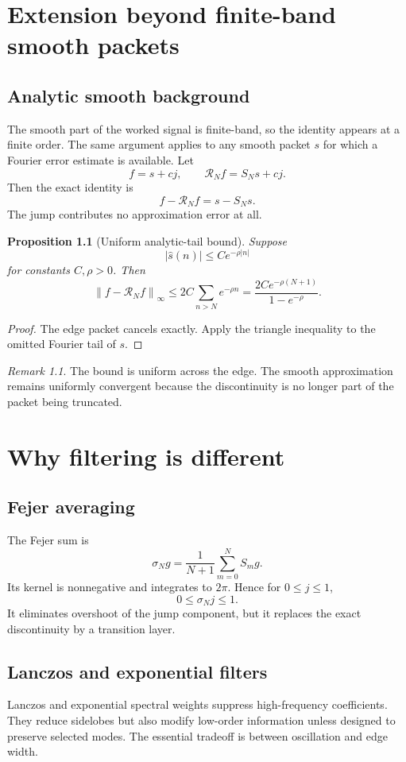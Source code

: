 \documentclass[11pt,oneside]{book}
\newtheorem{proposition}[theorem]{Proposition}
\theoremstyle{remark}
\newtheorem{remark}[theorem]{Remark}
\newcommand{\norm}[1]{\left\lVert #1\right\rVert}
\newcommand{\SN}{S_N}
\newcommand{\RN}{\mathcal R_N}
\begin{document}
\chapter{Extension beyond finite-band smooth packets}

\section{Analytic smooth background}
The smooth part of the worked signal is finite-band, so the identity appears at a finite order. The same argument applies to any smooth packet $s$ for which a Fourier error estimate is available. Let
\[
 f=s+cj,
\qquad
\RN f=\SN s+cj.
\]
Then the exact identity is
\[
\boxed{f-\RN f=s-\SN s.}
\]
The jump contributes no approximation error at all.

\begin{proposition}[Uniform analytic-tail bound]
Suppose
\[
 |\widehat s(n)|\le Ce^{-\rho|n|}
\]
for constants $C,\rho>0$. Then
\[
\norm{f-\RN f}_{\infty}
\le
2C\sum_{n>N}e^{-\rho n}
=\boxed{\frac{2Ce^{-\rho(N+1)}}{1-e^{-\rho}}}.
\]
\end{proposition}

\begin{proof}
The edge packet cancels exactly. Apply the triangle inequality to the omitted Fourier tail of $s$.
\end{proof}

\begin{remark}
The bound is uniform across the edge. The smooth approximation remains uniformly convergent because the discontinuity is no longer part of the packet being truncated.
\end{remark}

\chapter{Why filtering is different}

\section{Fejer averaging}
The Fejer sum is
\[
 \sigma_Ng=\frac1{N+1}\sum_{m=0}^{N}S_mg.
\]
Its kernel is nonnegative and integrates to $2\pi$. Hence for $0\le j\le1$,
\[
0\le\sigma_Nj\le1.
\]
It eliminates overshoot of the jump component, but it replaces the exact discontinuity by a transition layer.

\section{Lanczos and exponential filters}
Lanczos and exponential spectral weights suppress high-frequency coefficients. They reduce sidelobes but also modify low-order information unless designed to preserve selected modes. The essential tradeoff is between oscillation and edge width.
\end{document}
